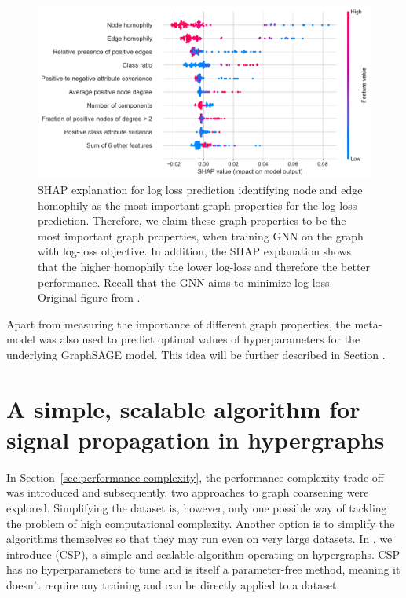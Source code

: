 \begin{figure}
	\includegraphics[width=\linewidth]{images/graph-property-importance.pdf}
	\caption{SHAP explanation for log loss prediction identifying node and edge homophily as the most important graph properties for the log-loss prediction. Therefore, we claim these graph properties to be the most important graph properties, when training GNN on the graph with log-loss objective. In addition, the SHAP explanation shows that the higher homophily the lower log-loss and therefore the better performance. Recall that the GNN aims to minimize log-loss. Original figure from \cite{prochazka_which_2023}.}
	\label{fig:graph-property-importance}
\end{figure}

Apart from measuring the importance of different graph properties, the meta-model was also used to predict optimal values of hyperparameters for the underlying GraphSAGE model. This idea will be further described in Section .

\section{A simple, scalable algorithm for signal propagation in hypergraphs}

In Section~\ref{sec:performance-complexity}, the performance-complexity trade-off was introduced and subsequently, two approaches to graph coarsening were explored. Simplifying the dataset is, however, only one possible way of tackling the problem of high computational complexity. Another option is to simplify the algorithms themselves so that they may run even on very large datasets. In \cite{prochazka_convolutional_2024}, we introduce  (CSP), a simple and scalable algorithm operating on hypergraphs. CSP has no hyperparameters to tune and is itself a parameter-free method, meaning it doesn't require any training and can be directly applied to a dataset.

